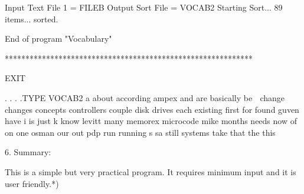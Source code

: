 Input Text File 1 = FILEB
Output Sort File = VOCAB2
Starting Sort...   89 items... sorted.

End of program "Vocabulary"

************************************************************

EXIT

.
.
.
.TYPE VOCAB2
a                   
about               
according           
ampex               
and                 
are                 
basically           
be
                  
change              
changes             
concepts            
controllers         
couple              
disk                
drives              
each                
existing            
first               
for                 
found               
guven               
have                
i                   
is                  
just                
k                   
know                
levitt              
many                
memorex             
microcode           
mike                
months              
needs               
now                 
of                  
on                  
one                 
osman               
our                 
out                 
pdp                 
run                 
running             
s                   
sa                  
still               
systems             
take                
that                
the                 
this

6. Summary:

        This is a simple but very practical program. It requires
   minimum input and it is user friendly.*)

    